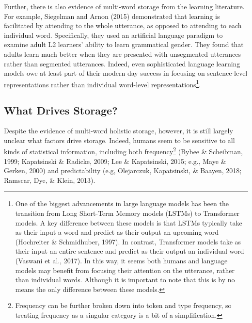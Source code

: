\documentclass[
  man,floatsintext]{apa6}
\begin{document}
Further, there is also evidence of multi-word storage from the learning literature. For example, Siegelman and Arnon (2015) demonstrated that learning is facilitated by attending to the whole utterance, as opposed to attending to each individual word. Specifically, they used an artificial language paradigm to examine adult L2 learners' ability to learn grammatical gender. They found that adults learn much better when they are presented with unsegmented utterances rather than segmented utterances. Indeed, even sophisticated language learning models owe at least part of their modern day success in focusing on sentence-level representations rather than individual word-level representations\footnote{One of the biggest advancements in large language models has been the transition from Long Short-Term Memory models (LSTMs) to Transformer models. A key difference between these models is that LSTMs typically take as their input a word and predict as their output an upcoming word (Hochreiter \& Schmidhuber, 1997). In contrast, Transformer models take as their input an entire sentence and predict as their output an individual word (Vaswani et al., 2017). In this way, it seems both humans and language models may benefit from focusing their attention on the utterance, rather than individual words. Although it is important to note that this is by no means the only difference between these models.}.

\subsection{What Drives Storage?}\label{what-drives-storage}

Despite the evidence of multi-word holistic storage, however, it is still largely unclear what factors drive storage. Indeed, humans seem to be sensitive to all kinds of statistical information, including both frequency\footnote{Frequency can be further broken down into token and type frequency, so treating frequency as a singular category is a bit of a simplification.} (Bybee \& Scheibman, 1999; Kapatsinski \& Radicke, 2009; Lee \& Kapatsinski, 2015; e.g., Maye \& Gerken, 2000) and predictability (e.g, Olejarczuk, Kapatsinski, \& Baayen, 2018; Ramscar, Dye, \& Klein, 2013).
\end{document}
